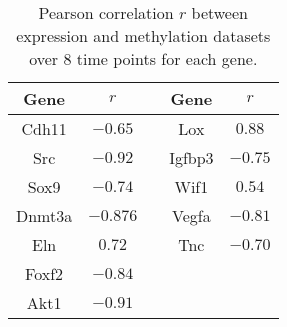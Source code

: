 \documentclass[10pt]{article}
\begin{document}
\begin{table}
\centering
\begin{tabular}{|c|c|c|c|c|}
\hline
Gene & $r$  & & Gene & $r$ \\
\hline
Cdh11 & $-0.65$ & & Lox & $0.88$ \\
\hline
Src & $-0.92$ & & Igfbp3 & $-0.75$ \\
\hline
Sox9 & $-0.74$ & & Wif1 & $0.54$ \\
\hline
Dnmt3a & $-0.876$ & & Vegfa & $-0.81$ \\
\hline
Eln & $0.72$ & & Tnc & $-0.70$ \\
\hline
Foxf2 & $-0.84$ & & & \\
\hline
Akt1 & $-0.91$ & & &  \\
\hline
\end{tabular}
\caption{Pearson correlation $r$  between expression and
  methylation datasets over $8$ time points for each gene.}
\label{tab:sup2}
\end{table}

\newpage



\end{document}
